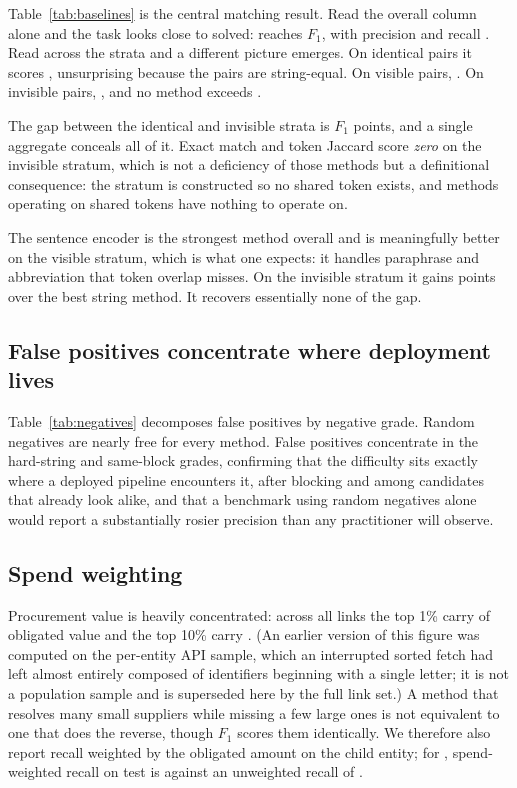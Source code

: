 Table~\ref{tab:baselines} is the central matching result. Read the overall column alone
and the task looks close to solved: \BestMethod reaches \BestOverallF $F_1$, with
precision \BestOverallPrec and recall \BestOverallRecall. Read across the strata and a
different picture emerges. On identical pairs it scores \BestIdenticalF, unsurprising
because the pairs are string-equal. On visible pairs, \BestVisibleF. On invisible pairs,
\BestInvisibleF, and no method exceeds \AnyInvisibleFMax.



The gap between the identical and invisible strata is \VisibilityGap $F_1$ points, and a
single aggregate conceals all of it. Exact match and token Jaccard score \emph{zero} on
the invisible stratum, which is not a deficiency of those methods but a definitional
consequence: the stratum is constructed so no shared token exists, and methods operating
on shared tokens have nothing to operate on.

The sentence encoder is the strongest method overall and is meaningfully better on the
visible stratum, which is what one expects: it handles paraphrase and abbreviation that
token overlap misses. On the invisible stratum it gains \EmbOverStringInvisible points
over the best string method. It recovers essentially none of the gap.

\subsection{False positives concentrate where deployment lives}

Table~\ref{tab:negatives} decomposes false positives by negative grade. Random negatives
are nearly free for every method. False positives concentrate in the hard-string and
same-block grades, confirming that the difficulty sits exactly where a deployed pipeline
encounters it, after blocking and among candidates that already look alike, and that a
benchmark using random negatives alone would report a substantially rosier precision than
any practitioner will observe.



\subsection{Spend weighting}

Procurement value is heavily concentrated: across all \BenchPositives links the top 1\%
carry \SpendTopOnePct of obligated value and the top 10\% carry \SpendTopTenPct. (An
earlier version of this figure was computed on the per-entity API sample, which an
interrupted sorted fetch had left almost entirely composed of identifiers beginning with
a single letter; it is not a population sample and is superseded here by the full link
set.) A method that resolves many small suppliers while missing a few large ones is not
equivalent to one that does the reverse, though $F_1$ scores them identically. We
therefore also report recall weighted by the obligated amount on the child entity; for
\BestMethod, spend-weighted recall on test is \BestSpendRecall against an unweighted
recall of \BestOverallRecall.


